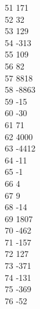{ 51	171 \\
 52	32 \\
 53	129 \\
 54	-313 \\
 55	109 \\
 56	82 \\
 57	8818 \\
 58	-8863 \\
 59	-15 \\
 60	-30 \\
 61	71 \\
 62	4000 \\
 63	-4412 \\
 64	-11 \\
 65	-1 \\
 66	4 \\
 67	9 \\
 68	-14 \\
 69	1807 \\
 70	-462 \\
 71	-157 \\
 72	127 \\
 73	-371 \\
 74	-131 \\
 75	-369 \\
 76	-52 \\
}
